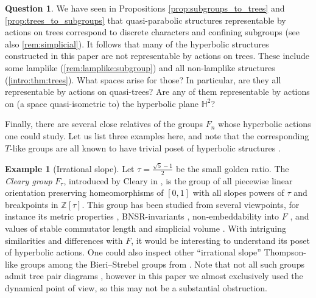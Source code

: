 \documentclass[reqno,12pt]{amsart}\setcounter{tocdepth}{1}
\theoremstyle{definition}
\newtheorem{example}[theorem]{Example}
\newtheorem{question}[theorem]{Question}
\newcommand{\Z}{\mathbb{Z}}
\numberwithin{equation}{section}
\begin{document}
\begin{question}
We have seen in Propositions \ref{prop:subgroups_to_trees} and \ref{prop:trees_to_subgroups} that quasi-parabolic structures representable by actions on trees correspond to discrete characters and confining subgroups (see also \cref{rem:simplicial}). It follows that many of the hyperbolic structures constructed in this paper are not representable by actions on trees. These include some lamplike (\cref{rem:lamplike:subgroup}) and all non-lamplike structures (\cref{intro:thm:trees}). What spaces arise for those? In particular, are they all representable by actions on quasi-trees? Are any of them representable by actions on (a space quasi-isometric to) the hyperbolic plane $\mathbb{H}^2$?
\end{question}

Finally, there are several close relatives of the groups $F_n$ whose hyperbolic actions one could study. Let us list three examples here, and note that the corresponding $T$-like groups are all known to have trivial poset of hyperbolic structures \cite{NL}. 

\begin{example}[Irrational slope]\label{ex:irrat}
Let $\tau=\frac{\sqrt{5}-1}{2}$ be the small golden ratio. The \emph{Cleary group} $F_\tau$, introduced by Cleary in \cite{cleary00}, is the group of all piecewise linear orientation preserving homeomorphisms of $[0,1]$ with all slopes powers of $\tau$ and breakpoints in $\Z[\tau]$. This group has been studied from several viewpoints, for instance its metric properties \cite{burillo21}, BNSR-invariants \cite{MNSR}, non-embeddability into $F$ \cite{hydemoore}, and values of stable commutator length and simplicial volume \cite{commutingconjugates}. With intriguing similarities and differences with $F$, it would be interesting to understand its poset of hyperbolic actions. One could also inspect other ``irrational slope'' Thompson-like groups among the Bieri--Strebel groups from \cite{bieristrebel}. Note that not all such groups admit tree pair diagrams \cite{winstone}, however in this paper we almost exclusively used the dynamical point of view, so this may not be a substantial obstruction.
\end{example}
\end{document}
